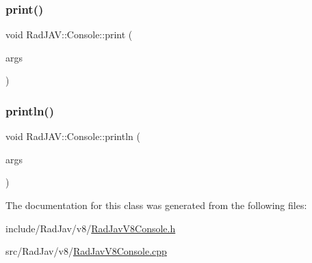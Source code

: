 \mbox{\label{class_rad_j_a_v_1_1_console_a1490b3b429e5d0d404102cbb8a577627}} 
\subsubsection{\texorpdfstring{print()}{print()}}
{\footnotesize\ttfamily void Rad\+J\+A\+V\+::\+Console\+::print (\begin{DoxyParamCaption}\item[{const v8\+::\+Function\+Callback\+Info$<$ v8\+::\+Value $>$ \&}]{args }\end{DoxyParamCaption})\hspace{0.3cm}{\ttfamily [static]}}

\mbox{\label{class_rad_j_a_v_1_1_console_a33eaa75ff2eb8009c31e5b1f04ba5e80}} 
\subsubsection{\texorpdfstring{println()}{println()}}
{\footnotesize\ttfamily void Rad\+J\+A\+V\+::\+Console\+::println (\begin{DoxyParamCaption}\item[{const v8\+::\+Function\+Callback\+Info$<$ v8\+::\+Value $>$ \&}]{args }\end{DoxyParamCaption})\hspace{0.3cm}{\ttfamily [static]}}



The documentation for this class was generated from the following files\+:\begin{DoxyCompactItemize}
\item 
include/\+Rad\+Jav/v8/\mbox{\hyperlink{_rad_jav_v8_console_8h}{Rad\+Jav\+V8\+Console.\+h}}\item 
src/\+Rad\+Jav/v8/\mbox{\hyperlink{_rad_jav_v8_console_8cpp}{Rad\+Jav\+V8\+Console.\+cpp}}\end{DoxyCompactItemize}
